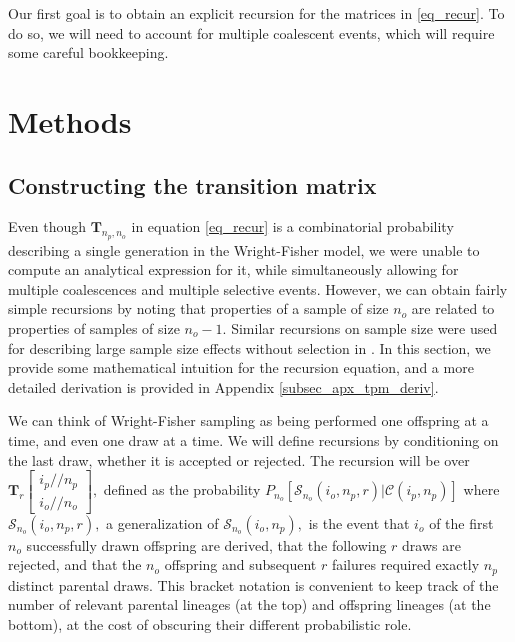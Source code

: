 \documentclass[review,nonatbib]{elsarticle}
\newcommand{\dslash}{/\!\!/}
\newcommand{\Coalc}[4]{\begin{bmatrix}#1\dslash #2 \\ #3\dslash #4 \end{bmatrix}}
\newcommand{\ms}{\mathcal{S}}
\begin{document}
Our first goal is to obtain an explicit recursion for the matrices in \eqref{eq_recur}. To do so, we
will need to account for multiple coalescent events, which will require some careful bookkeeping.

\section{Methods}
\label{sec_methods}

\subsection{Constructing the transition matrix}
\label{subsec_trans_mat}

Even though $\mathbf{T}_{n_p,n_o}$ in equation \ref{eq_recur} is a combinatorial probability
describing a single generation in the Wright-Fisher model, we were unable to compute an analytical
expression for it, while simultaneously allowing for multiple coalescences and multiple selective events. 
However,
we can obtain fairly simple recursions by noting that properties of a sample of size $n_o$ are
related to properties of samples of size $n_o-1.$ Similar recursions on sample size were used for
describing large sample size effects without selection in \citep{BhaskarEtAl2014}. In this section,
we provide some mathematical intuition for the recursion equation, and a more detailed derivation is provided in
Appendix \ref{subsec_apx_tpm_deriv}.

We can think of Wright-Fisher sampling as being performed one offspring at a time,
and even one draw at a time. We will define recursions by conditioning on the last draw, 
whether it is accepted or rejected. 
The recursion will be over $\mathbf{T}_{r}\Coalc{i_p}{n_p}{i_o}{n_o},$ defined as the probability
$P_{n_o}\left[\ms_{n_o}(i_o, n_p, r) | \mathcal{C}(i_p, n_p)\right]$ where $\ms_{n_o}(i_o, n_p, r),$ 
a generalization of  $\ms_{n_o}(i_o, n_p),$ 
is the event that $i_o$ of the first $n_o$ successfully drawn offspring are derived, 
that the following $r$ draws are rejected, and that the $n_o$ offspring and subsequent $r$ failures 
required exactly $n_p$ distinct parental draws. 
This bracket notation is convenient to keep track of
the number of relevant parental lineages (at the top) and offspring lineages (at the bottom), at the
cost of obscuring their different probabilistic role.
\end{document}
